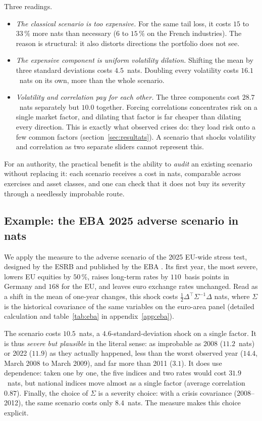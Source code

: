 \documentclass[11pt]{article}
\theoremstyle{definition}
\begin{document}
Three readings.
\begin{itemize}
\item \emph{The classical scenario is too expensive.} For the same tail loss,
it costs $15$ to $33\,\%$ more nats than necessary ($6$ to $15\,\%$ on the
French industries). The reason is structural: it also distorts directions the
portfolio does not see.
\item \emph{The expensive component is uniform volatility dilation.} Shifting
the mean by three standard deviations costs $4.5$~nats. Doubling every
volatility costs $16.1$~nats on its own, more than the whole scenario.
\item \emph{Volatility and correlation pay for each other.} The three
components cost $28.7$~nats separately but $10.0$ together. Forcing
correlations concentrates risk on a single market factor, and dilating that
factor is far cheaper than dilating every direction. This is exactly what
observed crises do: they load risk onto a few common factors
(section~\ref{sec:resultats}). A scenario that shocks volatility and
correlation as two separate sliders cannot represent this.
\end{itemize}
For an authority, the practical benefit is the ability to \emph{audit} an
existing scenario without replacing it: each scenario receives a cost in nats,
comparable across exercises and asset classes, and one can check that it does
not buy its severity through a needlessly improbable route.

\subsection{Example: the EBA 2025 adverse scenario in nats}
\label{sec:eba}

We apply the measure to the adverse scenario of the 2025 EU-wide stress test,
designed by the ESRB and published by the EBA \citep{eba2025}. Its first year,
the most severe, lowers EU equities by $50\,\%$, raises long-term rates by
$110$~basis points in Germany and $168$ for the EU, and leaves euro exchange
rates unchanged. Read as a shift in the mean of one-year changes, this shock
costs $\tfrac12\Delta^\top\Sigma^{-1}\Delta$ nats, where $\Sigma$ is the
historical covariance of the same variables on the euro-area panel (detailed
calculation and table~\ref{tab:eba} in appendix~\ref{app:eba}).

The scenario costs $10.5$~nats, a $4.6$-standard-deviation shock on a single
factor. It is thus \emph{severe but plausible} in the literal sense: as
improbable as 2008 ($11.2$~nats) or 2022 ($11.9$) as they actually happened,
less than the worst observed year ($14.4$, March 2008 to March 2009), and far
more than 2011 ($3.1$). It does use dependence: taken one by one, the five
indices and two rates would cost $31.9$~nats, but national indices move
almost as a single factor (average correlation $0.87$). Finally, the choice of
$\Sigma$ is a severity choice: with a crisis covariance (2008--2012), the same
scenario costs only $8.4$~nats. The measure makes this choice explicit.
\end{document}
